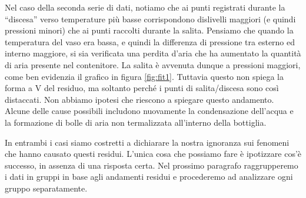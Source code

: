 Nel caso della seconda serie di dati, notiamo che ai punti registrati durante la ``discesa'' verso temperature più basse
corrispondono dislivelli maggiori (e quindi pressioni minori) che ai punti raccolti durante la salita. Pensiamo che quando
la temperatura del vaso era bassa, e quindi la differenza di pressione tra esterno ed interno maggiore, si sia verificata una perdita d'aria
che ha aumentato la quantità di aria presente nel contenitore. La salita è avvenuta dunque a pressioni maggiori, come
ben evidenzia il grafico in figura \ref{fig:fit1}. Tuttavia questo non spiega la forma a V del residuo, ma soltanto perché i punti
di salita/discesa sono così distaccati. Non abbiamo ipotesi che riescono a spiegare questo andamento. Alcune delle cause possibili
includono nuovamente la condensazione dell'acqua e la formazione di bolle di aria non termalizzata all'interno della bottiglia.

In entrambi i casi siamo costretti a dichiarare la nostra ignoranza sui fenomeni che hanno causato questi residui. L'unica cosa che
possiamo fare è ipotizzare cos'è successo, in assenza di una risposta certa. Nel prossimo paragrafo raggrupperemo i dati
in gruppi in base agli andamenti residui e procederemo ad analizzare ogni gruppo separatamente.

